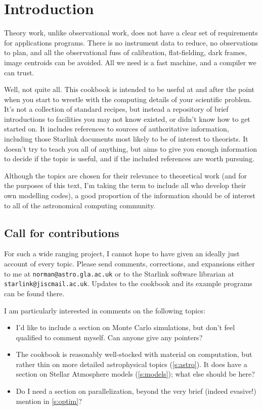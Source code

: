 \documentclass[11pt,oneside,chapters]{starlink}
\begin{document}
\scfrontmatter

\chapter{Introduction}
\label{s:intro}

Theory work, unlike observational work, does not have a clear set
of requirements for applications programs.  There is no instrument
data to reduce, no observations to plan, and all the observational
fuss of calibration, flat-fielding, dark frames, image centroids can
be avoided.  All we need is a fast machine, and a compiler we can
trust.

Well, not quite all. This cookbook is intended to be useful at and
after the point when you start to wrestle with the computing details
of your scientific problem.  It's not a collection of standard
recipes, but instead a repository of brief introductions to facilities
you may not know existed, or didn't know how to get started on.  It
includes references to sources of authoritative information, including
those Starlink documents most likely to be of interest to theorists.
It doesn't try to teach you all of anything, but aims to give you
enough information to decide if the topic is useful, and if the
included references are worth pursuing.

Although the topics are chosen for their relevance to theoretical
work (and for the purposes of this text, I'm taking the term to
include all who develop their own modelling codes), a good proportion
of the information should be of interest to
all of the astronomical computing community.

\section{Call for contributions}
\label{s:contributions}

For such a wide ranging project, I cannot hope to have given an
ideally just account of every topic.  Please send comments,
corrections, and expansions either to me at \texttt{norman@astro.gla.ac.uk}
or to the Starlink software librarian at \texttt{starlink@jiscmail.ac.uk}.
Updates to the cookbook and its example programs can be found there.

I am particularly interested in comments on the following topics:

\begin{itemize}
\item
I'd like to include a section on Monte Carlo
simulations, but don't feel qualified to comment
myself.  Can anyone
give any pointers?

\item
The cookbook is reasonably well-stocked with
material on computation, but rather thin on more
detailed astrophysical topics (\ref{s:astro}).
It does have a section on Stellar Atmosphere models
(\ref{s:models}); what else should be here?

\item
Do I need a section on parallelization, beyond the
very brief (indeed evasive!) mention in \ref{s:optim}?
\end{itemize}
\end{document}
